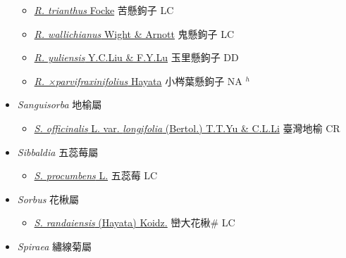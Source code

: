 \begin{itemize}
\begin{itemize}
        \item[] \href{http://www.theplantlist.org/tpl1.1/search?q=Rubus+trianthus}{\textit{R. trianthus} Focke}   苦懸鉤子 LC
        \item[] \href{http://www.theplantlist.org/tpl1.1/search?q=Rubus+wallichianus}{\textit{R. wallichianus} Wight \& Arnott}   鬼懸鉤子 LC
        \item[] \href{http://www.theplantlist.org/tpl1.1/search?q=Rubus+yuliensis}{\textit{R. yuliensis} Y.C.Liu \& F.Y.Lu}   玉里懸鉤子 DD
        \item[] \href{http://www.theplantlist.org/tpl1.1/search?q=Rubus+×parvifraxinifolius}{\textit{R. ×parvifraxinifolius} Hayata}   小梣葉懸鉤子 NA $^h$
  \end{itemize}
 \item[] \textit{Sanguisorba} 地榆屬
                    
  \begin{itemize}
        \item[] \href{http://www.theplantlist.org/tpl1.1/search?q=Sanguisorba+officinalis+var.+longifolia}{\textit{S. officinalis} L. var. \textit{longifolia} (Bertol.) T.T.Yu \& C.L.Li}   臺灣地榆 CR
  \end{itemize}
 \item[] \textit{Sibbaldia} 五蕊莓屬
                    
  \begin{itemize}
        \item[] \href{http://www.theplantlist.org/tpl1.1/search?q=Sibbaldia+procumbens}{\textit{S. procumbens} L.}   五蕊莓 LC
  \end{itemize}
 \item[] \textit{Sorbus} 花楸屬
                    
  \begin{itemize}
        \item[] \href{http://www.theplantlist.org/tpl1.1/search?q=Sorbus+randaiensis}{\textit{S. randaiensis} (Hayata) Koidz.}   巒大花楸\# LC
  \end{itemize}
 \item[] \textit{Spiraea} 繡線菊屬
                    

\end{itemize}
